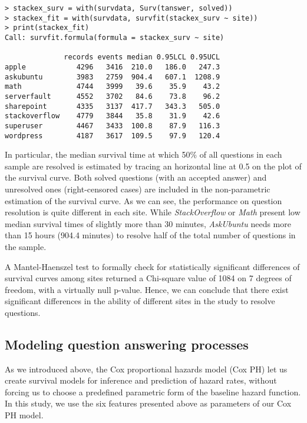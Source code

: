\documentclass{chi2012}
\begin{document}
\begin{lstlisting}[breaklines=true,
caption={Summary of number of events (solved questions), median 
survival time (in minutes) and its associated 95\% confidence interval 
for each site.},
basicstyle=\ttfamily\scriptsize,
frame=lines,
showtabs=false,
showspaces=false,
showstringspaces=false,
captionpos=b]
> stackex_surv = with(survdata, Surv(tanswer, solved))
> stackex_fit = with(survdata, survfit(stackex_surv ~ site))
> print(stackex_fit)
Call: survfit.formula(formula = stackex_surv ~ site)

              records events median 0.95LCL 0.95UCL
apple            4296   3416  210.0   186.0   247.3
askubuntu        3983   2759  904.4   607.1  1208.9
math             4744   3999   39.6    35.9    43.2
serverfault      4552   3702   84.6    73.8    96.2
sharepoint       4335   3137  417.7   343.3   505.0
stackoverflow    4779   3844   35.8    31.9    42.6
superuser        4467   3433  100.8    87.9   116.3
wordpress        4187   3617  109.5    97.9   120.4
\end{lstlisting}

In particular, the median survival time at which 50\% of all questions in 
each sample are resolved is
estimated by tracing an horizontal line at 0.5 on the plot of the survival curve. 
Both solved questions (with an accepted answer) and unresolved ones (right-censored 
cases) are included in the non-parametric estimation of the survival curve. As we
can see, the performance on question resolution is quite different in each site.
While \textit{StackOverflow} or \textit{Math} present low median survival
times of slightly more than 30 minutes, \textit{AskUbuntu} needs more than
15 hours (904.4 minutes) to resolve half of the total number of questions in the
sample.

A Mantel-Haenszel test \cite{mantel1959} to formally check for statistically
significant differences of survival curves among sites returned a Chi-square value
of 1084 on 7 degrees of freedom, with a virtually null p-value. Hence, we can conclude
that there exist significant differences in the ability of different sites in the
study to resolve questions. 

\subsection{Modeling question answering processes}

As we introduced above, the Cox proportional hazards model (Cox PH) let us create
survival models for inference and prediction of hazard rates, without forcing us
to choose a predefined parametric form of the baseline hazard function. In this
study, we use the six features presented above as parameters of our Cox PH model. 
\end{document}
